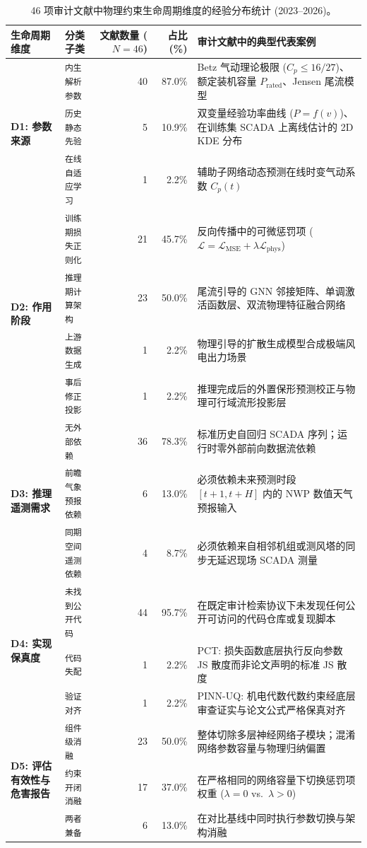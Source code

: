 \begin{table}[!t]
\centering
\footnotesize
\renewcommand{\arraystretch}{0.92}
\setlength{\tabcolsep}{3.5pt}
\caption{46 项审计文献中物理约束生命周期维度的经验分布统计 (2023--2026)。}
\label{tab:lifecycle_distribution}
\begin{tabularx}{\textwidth}{p{3.6cm}p{3.0cm}rrX}
\toprule
\textbf{生命周期维度} & \textbf{分类子类} & \textbf{文献数量 ($N=46$)} & \textbf{占比 (\%)} & \textbf{审计文献中的典型代表案例} \\
\midrule
\multirow{3}{*}{\textbf{D1: 参数来源}} 
& \texttt{内生解析参数} & 40 & 87.0\% & Betz 气动理论极限 ($C_p \le 16/27$)、额定装机容量 $P_{\text{rated}}$、Jensen 尾流模型 \\
& \texttt{历史静态先验} & 5 & 10.9\% & 双变量经验功率曲线 ($P=f(v)$)、在训练集 SCADA 上离线估计的 2D KDE 分布 \\
& \texttt{在线自适应学习} & 1 & 2.2\% & 辅助子网络动态预测在线时变气动系数 $C_p(t)$ \\
\midrule
\multirow{4}{*}{\textbf{D2: 作用阶段}} 
& \texttt{训练期损失正则化} & 21 & 45.7\% & 反向传播中的可微惩罚项 ($\mathcal{L} = \mathcal{L}_{\text{MSE}} + \lambda \mathcal{L}_{\text{phys}}$) \\
& \texttt{推理期计算架构} & 23 & 50.0\% & 尾流引导的 GNN 邻接矩阵、单调激活函数层、双流物理特征融合网络 \\
& \texttt{上游数据生成} & 1 & 2.2\% & 物理引导的扩散生成模型合成极端风电出力场景 \\
& \texttt{事后修正投影} & 1 & 2.2\% & 推理完成后的外置保形预测校正与物理可行域流形投影层 \\
\midrule
\multirow{3}{*}{\textbf{D3: 推理遥测需求}} 
& \texttt{无外部依赖} & 36 & 78.3\% & 标准历史自回归 SCADA 序列；运行时零外部前向数据流依赖 \\
& \texttt{前瞻气象预报依赖} & 6 & 13.0\% & 必须依赖未来预测时段 $[t+1, t+H]$ 内的 NWP 数值天气预报输入 \\
& \texttt{同期空间遥测依赖} & 4 & 8.7\% & 必须依赖来自相邻机组或测风塔的同步无延迟现场 SCADA 测量 \\
\midrule
\multirow{3}{*}{\textbf{D4: 实现保真度}} 
& \texttt{未找到公开代码} & 44 & 95.7\% & 在既定审计检索协议下未发现任何公开可访问的代码仓库或复现脚本 \\
& \texttt{代码失配} & 1 & 2.2\% & PCT: 损失函数底层执行反向参数 JS 散度而非论文声明的标准 JS 散度 \\
& \texttt{验证对齐} & 1 & 2.2\% & PINN-UQ: 机电代数代数约束经底层审查证实与论文公式严格保真对齐 \\
\midrule
\multirow{3}{*}{\textbf{D5: 评估有效性与危害报告}} 
& \texttt{组件级消融} & 23 & 50.0\% & 整体切除多层神经网络子模块；混淆网络参数容量与物理归纳偏置 \\
& \texttt{约束开闭消融} & 17 & 37.0\% & 在严格相同的网络容量下切换惩罚项权重 ($\lambda=0$ vs.\ $\lambda>0$) \\
& \texttt{两者兼备} & 6 & 13.0\% & 在对比基线中同时执行参数切换与架构消融 \\
\bottomrule
\end{tabularx}
\end{table}
